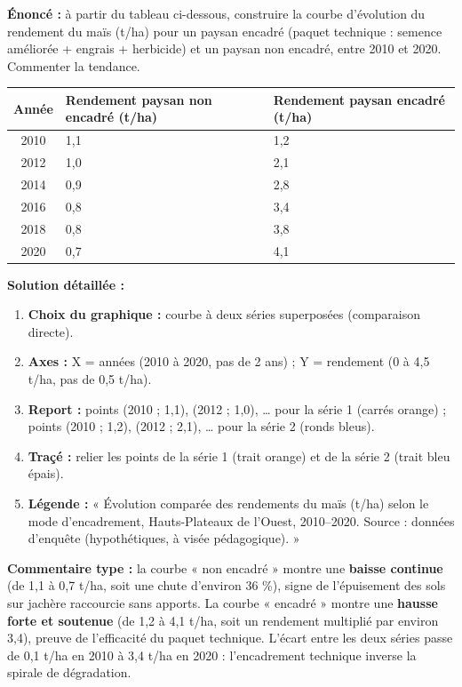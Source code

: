 \documentclass[11pt]{article}
\begin{document}
\begin{exoresolu}
\textbf{Énoncé :} à partir du tableau ci-dessous, construire la courbe d'évolution du rendement du maïs (t/ha) pour un paysan encadré (paquet technique : semence améliorée + engrais + herbicide) et un paysan non encadré, entre 2010 et 2020. Commenter la tendance.

\begin{center}
\begin{tabularx}{\linewidth}{|c|X|X|}\hline
\rowcolor{popblueL}\textbf{Année} & \textbf{Rendement paysan non encadré (t/ha)} & \textbf{Rendement paysan encadré (t/ha)} \\ \hline
2010 & 1,1 & 1,2 \\
2012 & 1,0 & 2,1 \\
2014 & 0,9 & 2,8 \\
2016 & 0,8 & 3,4 \\
2018 & 0,8 & 3,8 \\
2020 & 0,7 & 4,1 \\ \hline
\end{tabularx}
\end{center}

\tcblower
\textbf{Solution détaillée :}
\begin{enumerate}
    \item \textbf{Choix du graphique :} courbe à deux séries superposées (comparaison directe).
    \item \textbf{Axes :} X = années (2010 à 2020, pas de 2 ans) ; Y = rendement (0 à 4,5 t/ha, pas de 0,5 t/ha).
    \item \textbf{Report :} points (2010 ; 1,1), (2012 ; 1,0), \dots{} pour la série 1 (carrés orange) ; points (2010 ; 1,2), (2012 ; 2,1), \dots{} pour la série 2 (ronds bleus).
    \item \textbf{Traçé :} relier les points de la série 1 (trait orange) et de la série 2 (trait bleu épais).
    \item \textbf{Légende :} « Évolution comparée des rendements du maïs (t/ha) selon le mode d'encadrement, Hauts-Plateaux de l'Ouest, 2010--2020. Source : données d'enquête (hypothétiques, à visée pédagogique). »
\end{enumerate}
\textbf{Commentaire type :} la courbe « non encadré » montre une \textbf{baisse continue} (de 1,1 à 0,7 t/ha, soit une chute d'environ 36 \%), signe de l'épuisement des sols sur jachère raccourcie sans apports. La courbe « encadré » montre une \textbf{hausse forte et soutenue} (de 1,2 à 4,1 t/ha, soit un rendement multiplié par environ 3,4), preuve de l'efficacité du paquet technique. L'écart entre les deux séries passe de 0,1 t/ha en 2010 à 3,4 t/ha en 2020 : l'encadrement technique inverse la spirale de dégradation.
\end{exoresolu}
\end{document}
